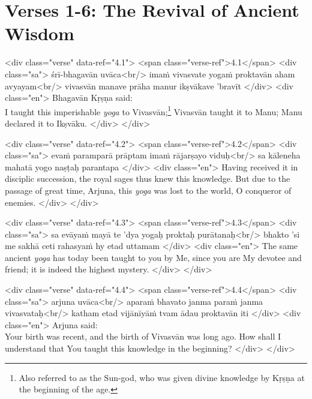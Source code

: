 \newpage
\section{Verses 1-6: The Revival of Ancient Wisdom}\label{sec-verses-1-6-the-revival-of-ancient-wisdom}

\begin{html}
<div class="verse" data-ref="4.1">
  <span class="verse-ref">4.1</span>
  <div class="sa">
    śrī-bhagavān uvāca<br/>
    imaṁ vivasvate yogaṁ proktavān aham avyayam<br/>
    vivasvān manave prāha manur ikṣvākave ’bravīt
  </div>
  <div class="en">
    \hspace*{1em}Bhagavān Kṛṣṇa said: \\ I taught this imperishable \textit{yoga} to Vivasvān;\footnote{Also referred to as the Sun-god, who was given divine knowledge by Kṛṣṇa at the beginning of the age.} Vivasvān taught it to Manu; Manu declared it to Ikṣvāku.
  </div>
</div>
\end{html}



\begin{html}
<div class="verse" data-ref="4.2">
  <span class="verse-ref">4.2</span>
  <div class="sa">
    evaṁ paramparā prāptam imaṁ rājarṣayo viduḥ<br/>
    sa kāleneha mahatā yogo naṣṭaḥ parantapa
  </div>
  <div class="en">
    Having received it in disciplic succession, the royal sages thus knew this knowledge. But due to the passage of great time, Arjuna, this \textit{yoga} was lost to the world, O conqueror of enemies.
  </div>
</div>
\end{html}



\begin{html}
<div class="verse" data-ref="4.3">
  <span class="verse-ref">4.3</span>
  <div class="sa">
    sa evāyaṁ mayā te ’dya yogaḥ proktaḥ purātanaḥ<br/>
    bhakto ’si me sakhā ceti rahasyaṁ hy etad uttamam
  </div>
  <div class="en">
    The same ancient \textit{yoga} has today been taught to you by Me, since you are My devotee and friend; it is indeed the highest mystery.
  </div>
</div>
\end{html}



\begin{html}
<div class="verse" data-ref="4.4">
  <span class="verse-ref">4.4</span>
  <div class="sa">
    arjuna uvāca<br/>
    aparaṁ bhavato janma paraṁ janma vivasvataḥ<br/>
    katham etad vijānīyāṁ tvam ādau proktavān iti
  </div>
  <div class="en">
    \hspace*{1em}Arjuna said: \\ Your birth was recent, and the birth of Vivasvān was long ago. How shall I understand that You taught this knowledge in the beginning?
  </div>
</div>
\end{html}



